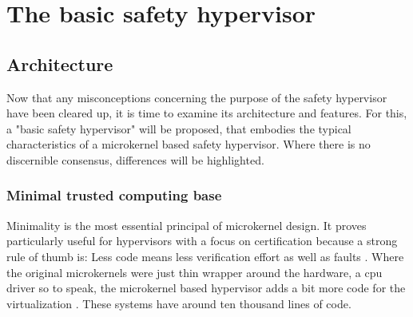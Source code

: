 
\chapter{The basic safety hypervisor} %

\label{Chapter2} %


\newcommand{\keyword}[1]{\textbf{#1}}
\newcommand{\tabhead}[1]{\textbf{#1}}
\newcommand{\code}[1]{\texttt{#1}}
\newcommand{\file}[1]{\texttt{\bfseries#1}}
\newcommand{\option}[1]{\texttt{\itshape#1}}



\section{Architecture}
Now that any misconceptions concerning the purpose of the safety hypervisor have been cleared up, it is time to examine its architecture and features. For this, a "basic safety hypervisor" will be proposed, that embodies the typical characteristics of a microkernel based safety hypervisor. Where there is no discernible consensus, differences will be highlighted.

\subsection{Minimal trusted computing base}
Minimality is the most essential principal of microkernel design. It proves particularly useful for hypervisors with a focus on certification because a strong rule of thumb is: Less code means less verification effort as well as faults \cite{Lipow.1982}.  
Where the original microkernels were just thin wrapper around the hardware, a \acrshort{cpu} driver so to speak, the microkernel based hypervisor adds a bit more code for the virtualization \cite{Heiser.2010}. These systems have around ten thousand lines of code.

